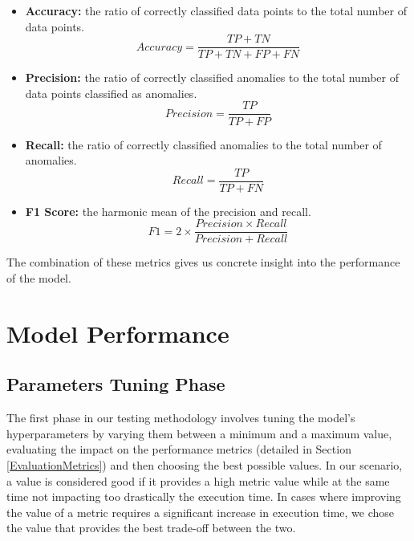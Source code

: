 \documentclass[futureinternet,article,submit,pdftex,moreauthors]{Definitions/mdpi}
\begin{document}
\begin{itemize}
	\item \textbf{Accuracy:} the ratio of correctly classified data points to the total number of data points.
	\begin{equation}
		\label{eq:accuracy}
	  Accuracy = \frac{TP + TN}{TP + TN + FP + FN}
	\end{equation}
	\item \textbf{Precision:} the ratio of correctly classified anomalies to the total number of data points classified as anomalies.
	\begin{equation}
		\label{eq:precision}
	  Precision = \frac{TP}{TP + FP}
	\end{equation}
	\item \textbf{Recall:} the ratio of correctly classified anomalies to the total number of anomalies.
	\begin{equation}
		\label{eq:recall}
	  Recall = \frac{TP}{TP + FN}
	\end{equation}
	\item \textbf{F1 Score:} the harmonic mean of the precision and recall.
	\begin{equation}
		\label{eq:f1}
	  F1 = 2 \times \frac{Precision \times Recall}{Precision + Recall}
	\end{equation}
\end{itemize}
The combination of these metrics gives us concrete insight into the performance of the model. 

\section{Model Performance }

\subsection{Parameters Tuning Phase}

The first phase in our testing methodology involves tuning the model's hyperparameters by varying them between a minimum and a maximum value, evaluating the impact on the performance metrics (detailed in Section \ref{EvaluationMetrics}) and then choosing the best possible values. 
In our scenario, a value is considered good if it provides a high metric value while at the same time not impacting too drastically the execution time. In cases where improving the value of a metric requires a significant increase in execution time, we chose the value that provides the best trade-off between the two.
\end{document}
